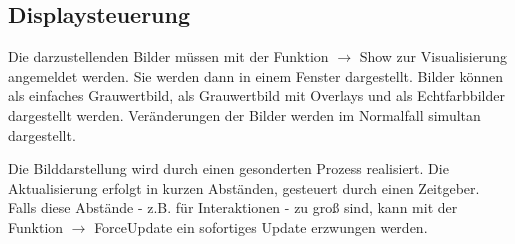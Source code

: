 \documentclass[10pt,titlepage]{article}
\def\see#1{$\to$ #1}
\begin{document}
\subsection{Displaysteuerung}

Die darzustellenden Bilder müssen mit der Funktion \see{Show} zur 
Visualisierung angemeldet werden. Sie werden dann in einem Fenster 
dargestellt. Bilder können als einfaches Grauwertbild, 
als Grauwertbild mit Overlays und als Echtfarbbilder dargestellt
werden. Veränderungen der Bilder werden im Normalfall simultan dargestellt.

Die Bilddarstellung wird durch einen gesonderten Prozess realisiert. Die
Aktualisierung erfolgt in kurzen Abständen, gesteuert durch einen Zeitgeber.
Falls diese Abstände - z.B. für Interaktionen - zu groß sind, kann
mit der Funktion \see{ForceUpdate} ein sofortiges Update erzwungen werden.
\end{document}
